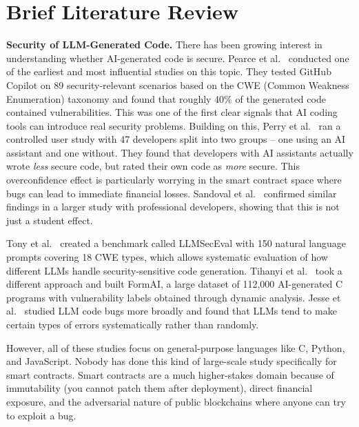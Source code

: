 \documentclass[11pt]{article}
\begin{document}
\section{Brief Literature Review}

\textbf{Security of LLM-Generated Code.}
There has been growing interest in understanding whether AI-generated code is secure. Pearce et al.~\cite{copilot_eval} conducted one of the earliest and most influential studies on this topic. They tested GitHub Copilot on 89 security-relevant scenarios based on the CWE (Common Weakness Enumeration) taxonomy and found that roughly 40\% of the generated code contained vulnerabilities. This was one of the first clear signals that AI coding tools can introduce real security problems. Building on this, Perry et al.~\cite{perry2023users} ran a controlled user study with 47 developers split into two groups -- one using an AI assistant and one without. They found that developers with AI assistants actually wrote \emph{less} secure code, but rated their own code as \emph{more} secure. This overconfidence effect is particularly worrying in the smart contract space where bugs can lead to immediate financial losses. Sandoval et al.~\cite{sandoval2023lost} confirmed similar findings in a larger study with professional developers, showing that this is not just a student effect.

Tony et al.~\cite{tony2023llmSecEval} created a benchmark called LLMSecEval with 150 natural language prompts covering 18 CWE types, which allows systematic evaluation of how different LLMs handle security-sensitive code generation. Tihanyi et al.~\cite{tihanyi2023formai} took a different approach and built FormAI, a large dataset of 112,000 AI-generated C programs with vulnerability labels obtained through dynamic analysis. Jesse et al.~\cite{jesse2023large} studied LLM code bugs more broadly and found that LLMs tend to make certain types of errors systematically rather than randomly.

However, all of these studies focus on general-purpose languages like C, Python, and JavaScript. Nobody has done this kind of large-scale study specifically for smart contracts. Smart contracts are a much higher-stakes domain because of immutability (you cannot patch them after deployment), direct financial exposure, and the adversarial nature of public blockchains where anyone can try to exploit a bug.
\end{document}
